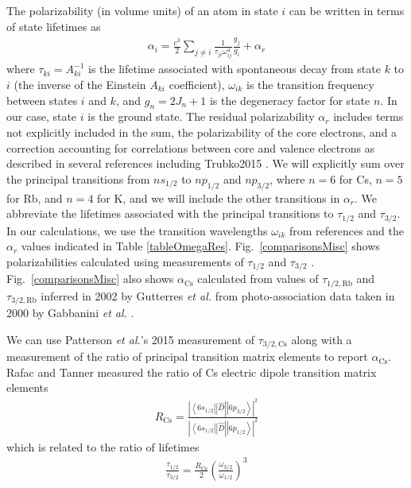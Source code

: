 \documentclass[twocolumn,pra,showpacs,superscriptaddress,longbibliography]{revtex4-1}   %
\newcommand{\brakett}[3]{\left.\left\langle #1 \right|\right|#2\left|\left| #3 \right\rangle\right.}
\newcommand{\figref}[1]{Fig.~\ref{#1}}
\newcommand{\acs}{\alpha_{\textrm{Cs}}}
\newcommand{\rcs}{R_{\mathrm{Cs}}}
\newcommand{\etal}{\textit{et al.}}
\newcommand{\etalspace}{\textit{et al. }}
\begin{document}
The polarizability (in volume units) of an atom in state $i$ can be written in terms of state lifetimes as
\begin{align}
	\alpha_i = \frac{c^3}{2} \sum_{j\neq i} 
	\frac{1}{\tau_{ji} \omega_{ij}^4} \frac{g_j}{g_i}
	+ \alpha_r
	\label{polFromLifetimes}
\end{align}
where $\tau_{ki} = A_{ki}^{-1}$ is the lifetime associated with spontaneous decay from state $k$ to $i$ (the inverse of the Einstein $A_{ki}$ coefficient),  $\omega_{ik}$ is the transition frequency between states $i$ and $k$, and $g_n = 2J_n+1$ is the degeneracy factor for state $n$. In our case, state $i$ is the ground state. The residual polarizability $\alpha_r$ includes terms not explicitly included in the sum, the polarizability of the core electrons, and a correction accounting for correlations between core and valence electrons as described in several references including Trubko2015
\cite{Derevianko1998, Derevianko2001, Safronova2006}.  We will explicitly sum over the principal transitions from $ns_{1/2}$ to $np_{1/2}$ and $np_{3/2}$, where $n=6$ for Cs, $n=5$ for Rb, and $n=4$ for K, and we will include the other transitions in $\alpha_r$. We abbreviate the lifetimes associated with the principal transitions to $\tau_{1/2}$ and $\tau_{3/2}$. In our calculations, we use the transition wavelengths $\omega_{ik}$ from references
\cite{Gerginov2005, Gerginov2006, Falke2006, Johansson1961}
and the $\alpha_r$ values indicated in Table \ref{tableOmegaRes}.
\figref{comparisonsMisc} shows polarizabilities calculated using measurements of $\tau_{1/2}$ and $\tau_{3/2}$
\cite{Young1994,Rafac1999,Bouloufa2007,Falke2006a,Volz2006,Simsarian1998,Wang1997}.
\figref{comparisonsMisc} also shows $\acs$ calculated from
values of $\tau_{1/2,\mathrm{Rb}}$ and $\tau_{3/2,\mathrm{Rb}}$ inferred in 2002 by Gutterres \etalspace from photo-association data taken in 2000 by Gabbanini \etalspace \cite{Gabbanini2000,Gutterres2002}.

We can use Patterson \etal's 2015 measurement of $\tau_{3/2,\mathrm{Cs}}$ \cite{Patterson2015} along with a measurement of the ratio of principal transition matrix elements to report $\acs$.
Rafac and Tanner measured the ratio of Cs electric dipole transition matrix elements \cite{Rafac1998}
\begin{align}
	\rcs = \frac
	{\left|\brakett{6s_{1/2}}{\hat{D}}{6p_{3/2}}\right|^2}
	{\left|\brakett{6s_{1/2}}{\hat{D}}{6p_{1/2}}\right|^2}
	\label{polFromLifetimes}
\end{align}
which is related to the ratio of lifetimes
\begin{align}
	\frac{\tau_{1/2}}{\tau_{3/2}} = \frac{\rcs}{2} \left( \frac{\omega_{3/2}}{\omega_{1/2}} \right)^3
	\label{RafacRLifetimes}
\end{align}
\end{document}

